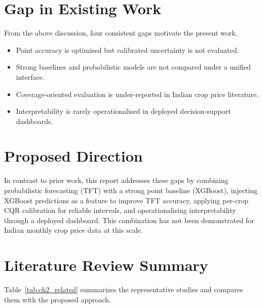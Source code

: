 \documentclass[12pt,a4paper]{report}
\begin{document}
\section{Gap in Existing Work}

From the above discussion, four consistent gaps motivate the present work.

\begin{itemize}
    \item Point accuracy is optimised but calibrated uncertainty is not evaluated.
    \item Strong baselines and probabilistic models are not compared under a unified
    interface.
    \item Coverage-oriented evaluation is under-reported in Indian crop price literature.
    \item Interpretability is rarely operationalised in deployed decision-support dashboards.
\end{itemize}

\section{Proposed Direction}

In contrast to prior work, this report addresses these gaps by combining probabilistic
forecasting (TFT) with a strong point baseline (XGBoost), injecting XGBoost predictions
as a feature to improve TFT accuracy, applying per-crop CQR calibration for reliable
intervals, and operationalising interpretability through a deployed dashboard.
This combination has not been demonstrated for Indian monthly crop price data at this scale.

\section{Literature Review Summary}

Table~\ref{tab:ch2_related} summarizes the representative studies and compares them with
the proposed approach.
\end{document}
